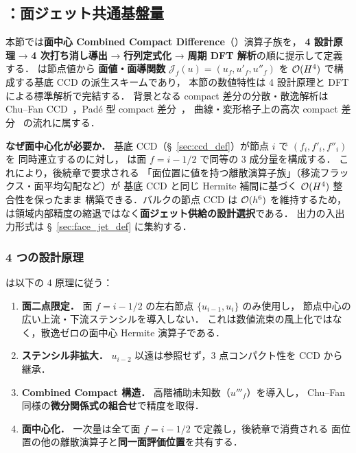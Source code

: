 %
%
\subsection{\texorpdfstring{{\FCCD}：面ジェット共通基盤量}{FCCD：面ジェット共通基盤量}}
\label{sec:fccd_def}

本節では\textbf{面中心 Combined Compact Difference}（{\FCCD}）演算子族を，
\textbf{4 設計原理} → \textbf{4 次打ち消し導出} → \textbf{行列定式化}
→ \textbf{周期 DFT 解析}の順に提示して定義する．
{\FCCD} は節点値から
\textbf{面値・面導関数} $\mathcal{J}_f(u)=(u_f, u'_f, u''_f)$ を
$\mathcal{O}(H^4)$ で構成する基底 CCD の派生スキームであり，
本節の数値特性は 4 設計原理と DFT による標準解析で完結する．
背景となる compact 差分の分散・散逸解析は
Chu--Fan CCD~\cite{ChuFan1998}，Padé 型 compact 差分~\cite{Lele1992}，
曲線・変形格子上の高次 compact 差分~\cite{VisbalGaitonde2002}
の流れに属する．

\medskip\noindent\textbf{なぜ面中心化が必要か．}
基底 CCD（§~\ref{sec:ccd_def}）が節点 $i$ で $(f_i, f'_i, f''_i)$ を
同時連立するのに対し，
{\FCCD} は面 $f=i-1/2$ で同等の 3 成分量を構成する．
これにより，後続章で要求される
「面位置に値を持つ離散演算子族」（移流フラックス・面平均勾配など）が
基底 CCD と同じ Hermite 補間に基づく $\mathcal{O}(H^4)$ 整合性を保ったまま
構築できる．バルクの節点 CCD は $\mathcal{O}(h^6)$ を維持するため，
{\FCCD} は領域内部精度の縮退ではなく\textbf{面ジェット供給の設計選択}である．
出力の入出力形式は §~\ref{sec:face_jet_def} に集約する．

\subsubsection{4 つの設計原理}
\label{sec:fccd_design_principles}

{\FCCD} は以下の 4 原理に従う：

\begin{enumerate}[label=\textbf{P-F\arabic*.}]
\item \textbf{面二点限定．}
      面 $f=i-1/2$ の左右節点 $\{u_{i-1}, u_i\}$ のみ使用し，
      節点中心の広い上流・下流ステンシルを導入しない．
      これは数値流束の風上化ではなく，散逸ゼロの面中心 Hermite 演算子である．
\item \textbf{ステンシル非拡大．}
      $u_{i-2}$ 以遠は参照せず，3 点コンパクト性を CCD から継承．
\item \textbf{Combined Compact 構造．}
      高階補助未知数（$u'''_f$）を導入し，
      Chu--Fan 同様の\textbf{微分関係式の組合せ}で精度を取得．
\item \textbf{面中心化．}
      一次量は全て面 $f = i-1/2$ で定義し，後続章で消費される
      面位置の他の離散演算子と\textbf{同一面評価位置}を共有する．
\end{enumerate}

